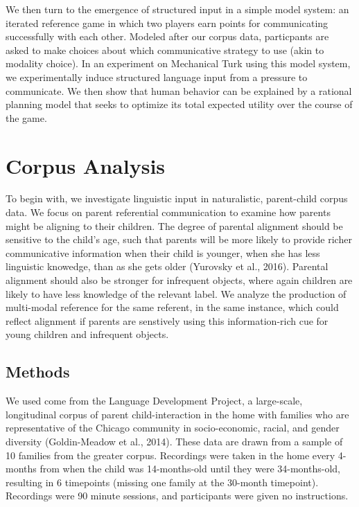 \documentclass[10pt, letterpaper]{article}
\begin{document}
We then turn to the emergence of structured input in a simple model
system: an iterated reference game in which two players earn points for
communicating successfully with each other. Modeled after our corpus
data, particpants are asked to make choices about which communicative
strategy to use (akin to modality choice). In an experiment on
Mechanical Turk using this model system, we experimentally induce
structured language input from a pressure to communicate. We then show
that human behavior can be explained by a rational planning model that
seeks to optimize its total expected utility over the course of the
game.

\section{Corpus Analysis}\label{corpus-analysis}

To begin with, we investigate linguistic input in naturalistic,
parent-child corpus data. We focus on parent referential communication
to examine how parents might be aligning to their children. The degree
of parental alignment should be sensitive to the child's age, such that
parents will be more likely to provide richer communicative information
when their child is younger, when she has less linguistic knowedge, than
as she gets older (Yurovsky et al., 2016). Parental alignment should
also be stronger for infrequent objects, where again children are likely
to have less knowledge of the relevant label. We analyze the production
of multi-modal reference for the same referent, in the same instance,
which could reflect alignment if parents are senstively using this
information-rich cue for young children and infrequent objects.

\subsection{Methods}\label{methods}

We used come from the Language Development Project, a large-scale,
longitudinal corpus of parent child-interaction in the home with
families who are representative of the Chicago community in
socio-economic, racial, and gender diversity (Goldin-Meadow et al.,
2014). These data are drawn from a sample of 10 families from the
greater corpus. Recordings were taken in the home every 4-months from
when the child was 14-months-old until they were 34-months-old,
resulting in 6 timepoints (missing one family at the 30-month
timepoint). Recordings were 90 minute sessions, and participants were
given no instructions.
\end{document}
